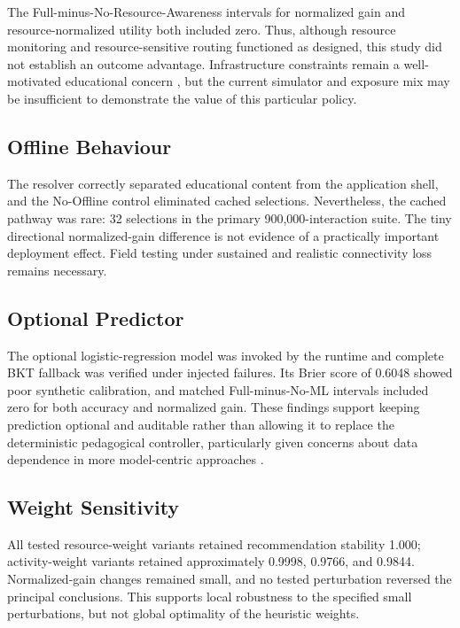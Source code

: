 \documentclass[conference]{IEEEtran}
\begin{document}
The Full-minus-No-Resource-Awareness intervals for normalized gain and
resource-normalized utility both included zero. Thus, although resource
monitoring and resource-sensitive routing functioned as designed, this study
did not establish an outcome advantage. Infrastructure constraints remain a
well-motivated educational concern \cite{hariyanto2025,mimoudi2025,
vandenberg2025}, but the current simulator and exposure mix may be insufficient
to demonstrate the value of this particular policy.

\subsection{Offline Behaviour}

The resolver correctly separated educational content from the application
shell, and the No-Offline control eliminated cached selections. Nevertheless,
the cached pathway was rare: 32 selections in the primary 900,000-interaction
suite. The tiny directional normalized-gain difference is not evidence of a
practically important deployment effect. Field testing under sustained and
realistic connectivity loss remains necessary.

\subsection{Optional Predictor}

The optional logistic-regression model was invoked by the runtime and complete
BKT fallback was verified under injected failures. Its Brier score of 0.6048
showed poor synthetic calibration, and matched Full-minus-No-ML intervals
included zero for both accuracy and normalized gain. These findings support
keeping prediction optional and auditable rather than allowing it to replace
the deterministic pedagogical controller, particularly given concerns about
data dependence in more model-centric approaches \cite{ruan2025,naseer2024,
amin2023}.

\subsection{Weight Sensitivity}

All tested resource-weight variants retained recommendation stability 1.000;
activity-weight variants retained approximately 0.9998, 0.9766, and 0.9844.
Normalized-gain changes remained small, and no tested perturbation reversed the
principal conclusions. This supports local robustness to the specified small
perturbations, but not global optimality of the heuristic weights.
\end{document}
